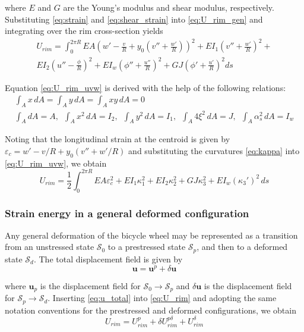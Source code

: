 \documentclass[\rootdir/thesis.tex]{subfiles}
\begin{document}
where $E$ and $G$ are the Young's modulus and shear modulus, respectively. Substituting \eqref{eq:strain} and \eqref{eq:shear_strain} into \eqref{eq:U_rim_gen} and integrating over the rim cross-section yields
\begin{multline}
\label{eq:U_rim_uvw}
U_{rim} = \int_0^{2\pi R}
	EA\left(w' - \frac{v}{R} + y_0\left(v'' + \frac{w'}{R}\right) \right)^2 +
	EI_1 \left(v'' + \frac{w'}{R}\right)^2 +\\
	EI_2 \left(u'' - \frac{\phi}{R}\right)^2 +
	EI_w\left(\phi'' + \frac{u''}{R}\right)^2 +
	GJ\left(\phi' + \frac{u'}{R}\right)^2 ds
\end{multline}

Equation \eqref{eq:U_rim_uvw} is derived with the help of the following relations:
\begin{gather}
\int_A x\, dA = \int_A y\, dA = \int_A xy\, dA = 0\\
\int_A dA = A,\,\,\, \int_A x^2\, dA = I_2,\,\,\, \int_A y^2\, dA = I_1,\,\,\,
\int_A 4\xi^2\, dA = J,\,\,\, \int_A \alpha_s^2\, dA = I_w
\end{gather}

Noting that the longitudinal strain at the centroid is given by $\varepsilon_c = w' - v/R + y_0(v'' + w'/R)$ and substituting the curvatures \eqref{eq:kappa} into \eqref{eq:U_rim_uvw}, we obtain
\begin{equation}
\label{eq:U_rim}
U_{rim} = \frac{1}{2}\int_0^{2\pi R} EA\varepsilon_c^2 + EI_1\kappa_1^2 + EI_2\kappa_2^2 + GJ\kappa_3^2 + EI_w(\kappa_3')^2\, ds
\end{equation}

\subsubsection{Strain energy in a general deformed configuration}

Any general deformation of the bicycle wheel may be represented as a transition from an unstressed state $\mathcal{S}_0$ to a prestressed state $\mathcal{S}_p$, and then to a deformed state $\mathcal{S}_d$. The total displacement field is given by
\begin{equation}
\label{eq:u_total}
\mathbf{u} = \mathbf{u}^p + \delta \mathbf{u}
\end{equation}

where $\mathbf{u}_p$ is the displacement field for $\mathcal{S}_0 \rightarrow \mathcal{S}_p$ and $\delta\mathbf{u}$ is the displacement field for $\mathcal{S}_p \rightarrow \mathcal{S}_d$. Inserting \eqref{eq:u_total} into \eqref{eq:U_rim} and adopting the same notation conventions for the prestressed and deformed configurations, we obtain
\begin{equation}
\label{eq:U_rim_total}
U_{rim} = U_{rim}^p + \delta U_{rim}^{p\delta} + U_{rim}^{\delta}
\end{equation}
\end{document}

